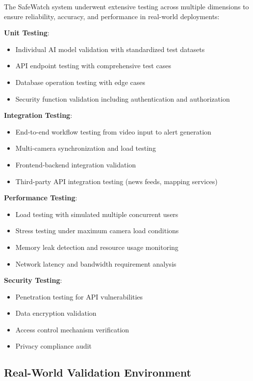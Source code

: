\documentclass[12pt,a4paper]{article}
\begin{document}
The SafeWatch system underwent extensive testing across multiple dimensions to ensure reliability, accuracy, and performance in real-world deployments:

\textbf{Unit Testing}:
\begin{itemize}
    \item Individual AI model validation with standardized test datasets
    \item API endpoint testing with comprehensive test cases
    \item Database operation testing with edge cases
    \item Security function validation including authentication and authorization
\end{itemize}

\textbf{Integration Testing}:
\begin{itemize}
    \item End-to-end workflow testing from video input to alert generation
    \item Multi-camera synchronization and load testing
    \item Frontend-backend integration validation
    \item Third-party API integration testing (news feeds, mapping services)
\end{itemize}

\textbf{Performance Testing}:
\begin{itemize}
    \item Load testing with simulated multiple concurrent users
    \item Stress testing under maximum camera load conditions
    \item Memory leak detection and resource usage monitoring
    \item Network latency and bandwidth requirement analysis
\end{itemize}

\textbf{Security Testing}:
\begin{itemize}
    \item Penetration testing for API vulnerabilities
    \item Data encryption validation
    \item Access control mechanism verification
    \item Privacy compliance audit
\end{itemize}

\subsection{Real-World Validation Environment}
\end{document}
